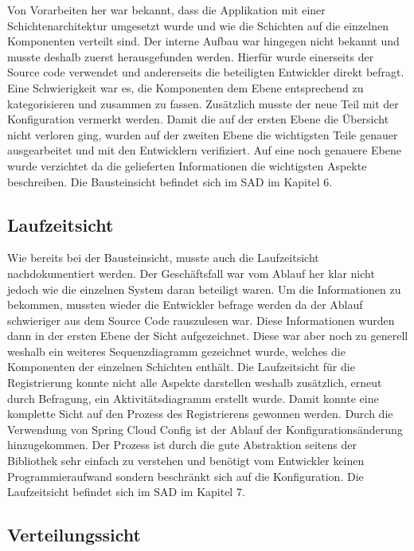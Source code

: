 Von Vorarbeiten her war bekannt, dass die Applikation mit einer Schichtenarchitektur umgesetzt wurde und wie die Schichten auf die einzelnen Komponenten verteilt sind. Der interne Aufbau war hingegen nicht bekannt und musste deshalb zuerst herausgefunden werden. Hierfür wurde einerseits der Source code verwendet und andererseits die beteiligten Entwickler direkt befragt. Eine Schwierigkeit war es, die Komponenten dem Ebene entsprechend zu kategorisieren und zusammen zu fassen. Zusätzlich musste der neue Teil mit der Konfiguration vermerkt werden. Damit die auf der ersten Ebene die Übersicht nicht verloren ging, wurden auf der zweiten Ebene die wichtigsten Teile genauer ausgearbeitet und mit den Entwicklern verifiziert. Auf eine noch genauere Ebene wurde verzichtet da die gelieferten Informationen die wichtigsten Aspekte beschreiben. Die Bausteinsicht befindet sich im SAD im Kapitel 6.

\subsection{Laufzeitsicht}

Wie bereits bei der Bausteinsicht, musste auch die Laufzeitsicht nachdokumentiert werden. Der Geschäftsfall war vom Ablauf her klar nicht jedoch wie die einzelnen System daran beteiligt waren. Um die Informationen zu bekommen, mussten wieder die Entwickler befrage werden da der Ablauf schwieriger aus dem Source Code rauszulesen war. Diese Informationen wurden dann in der ersten Ebene der Sicht aufgezeichnet. Diese war aber noch zu generell weshalb ein weiteres Sequenzdiagramm gezeichnet wurde, welches die Komponenten der einzelnen Schichten enthält. Die Laufzeitsicht für die Registrierung konnte nicht alle Aspekte darstellen weshalb zusätzlich, erneut durch Befragung, ein Aktivitätsdiagramm erstellt wurde. Damit konnte eine komplette Sicht auf den Prozess des Registrierens gewonnen werden.\newline\newline
Durch die Verwendung von Spring Cloud Config ist der Ablauf der Konfigurationsänderung hinzugekommen. Der Prozess ist durch die gute Abstraktion seitens der Bibliothek sehr einfach zu verstehen und benötigt vom Entwickler keinen Programmieraufwand sondern beschränkt sich auf die Konfiguration. Die Laufzeitsicht befindet sich im SAD im Kapitel 7.

\subsection{Verteilungssicht}

